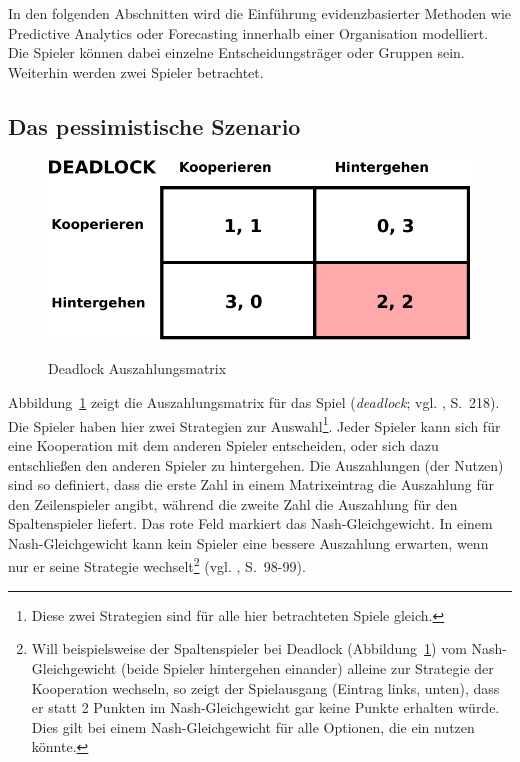 In den folgenden Abschnitten wird die Einführung evidenzbasierter Methoden wie Predictive Analytics oder Forecasting innerhalb einer
Organisation modelliert. Die Spieler können dabei einzelne Entscheidungsträger oder Gruppen sein. Weiterhin werden zwei Spieler
betrachtet. 


\subsection{Das pessimistische Szenario}

\begin{figure}%
\centering
\caption{Deadlock Auszahlungsmatrix}
\includegraphics[scale=0.8]{Grafiken/Deadlock_Ink.pdf} 
\label{pic:Deadlock}
\end{figure}

Abbildung~\ref{pic:Deadlock} zeigt die Auszahlungsmatrix für das Spiel \grqq{}
(\emph{deadlock}; vgl. \cite{Poundstone}, S.~218). Die Spieler haben hier zwei Strategien zur Auswahl\footnote{
Diese zwei Strategien sind für alle hier betrachteten Spiele gleich.
}. Jeder Spieler kann sich für eine Kooperation mit dem anderen Spieler entscheiden, oder sich dazu entschließen
den anderen Spieler zu hintergehen. Die Auszahlungen (der Nutzen) sind so definiert, dass die erste Zahl in einem Matrixeintrag
die Auszahlung für den Zeilenspieler angibt, während die zweite Zahl die Auszahlung für den Spaltenspieler liefert.
Das rote Feld markiert das Nash-Gleichgewicht. In einem Nash-Gleichgewicht kann kein Spieler eine bessere Auszahlung erwarten, wenn
nur er seine Strategie wechselt\footnote{
Will beispielsweise der Spaltenspieler bei Deadlock (Abbildung~\ref{pic:Deadlock}) vom Nash-Gleichgewicht (beide Spieler hintergehen
einander) alleine zur Strategie der Kooperation wechseln, so zeigt der Spielausgang (Eintrag links, unten), dass er statt 2 Punkten
im Nash-Gleichgewicht gar keine Punkte erhalten würde. Dies gilt bei einem Nash-Gleichgewicht für alle Optionen, die ein
\grqq{} nutzen könnte.
} (vgl. \cite{Poundstone}, S.~98-99).

